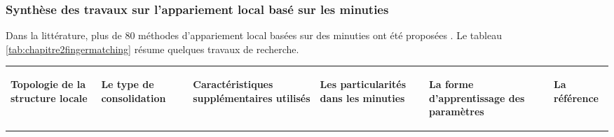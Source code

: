 \subsubsection{Synthèse des travaux sur l'appariement local basé sur les minuties}
Dans la littérature, plus de 80 méthodes d'appariement local basées sur des minuties ont été proposées \citep{Peralta2015a}.
Le tableau \ref{tab:chapitre2fingermatching} résume quelques travaux de recherche.

\begin{sidewaystable}[h!]
	\centering
	
	\begin{tabular}{|p{4cm}|p{4cm}|p{4cm}|p{3cm}|p{3cm}|p{4cm}|}
		\hline
		\begin{center}
			\textbf{Topologie de la structure locale}
		\end{center} &\begin{center}
			\textbf{Le type de consolidation}
		\end{center} &\begin{center}
			\textbf{Caractéristiques supplémentaires utilisés}
		\end{center} & \begin{center}
			\textbf{Les particularités dans les minuties} 
		\end{center}& \begin{center}
			\textbf{La forme d'apprentissage des paramètres}
		\end{center} &\begin{center}
			\textbf{La référence}\begin{center}
				

\end{center}
\end{center}
\end{tabular}
\end{sidewaystable}
